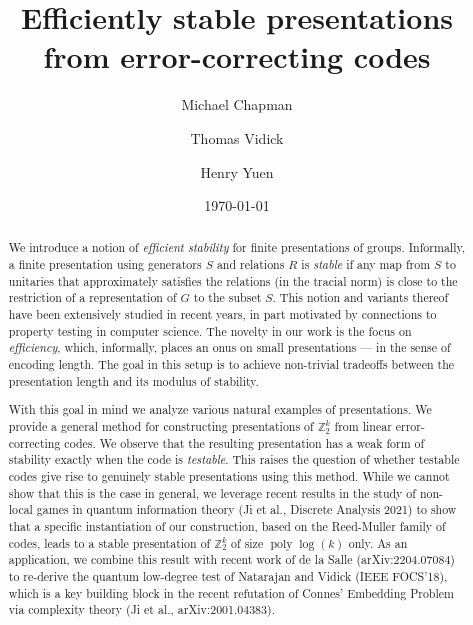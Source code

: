 \documentclass[11pt]{article}
\theoremstyle{definition}
\newcommand{\Z}{\ensuremath{\mathbb{Z}}}
\DeclareMathOperator{\poly}{poly}
\begin{document}
\title{Efficiently stable presentations from error-correcting codes}

\author[1]{Michael Chapman}
\author[2]{Thomas Vidick}
\author[3]{Henry Yuen}

\date{\today}
\maketitle

\noteswarning


\begin{abstract}
We introduce a notion of \emph{efficient stability} for finite presentations of groups. Informally, a finite presentation using generators $S$ and relations $R$ is \emph{stable} if any map from $S$ to unitaries 
that approximately satisfies the relations (in the tracial norm) is close to the restriction of a representation of $G$ to the subset $S$. This notion and variants thereof have been extensively studied in recent years, in part motivated by connections to property testing in computer science. The novelty in our work is the focus on \emph{efficiency}, which, informally, places an onus on small presentations --- in the sense of encoding length.  
The goal in this setup is to achieve non-trivial tradeoffs between the presentation length and its modulus of stability.

With this goal in mind we analyze various natural examples of presentations. We provide a general method for constructing presentations of $\Z_2^k$ from linear error-correcting codes. We observe that the resulting presentation has a weak form of stability exactly when the code is  \emph{testable}. This raises the question of whether testable codes give rise to genuinely stable presentations using this method.  While we cannot show that this is the case in general, we leverage recent results in the study of non-local games in quantum information theory (Ji et al., Discrete Analysis 2021) to show that a specific instantiation of our construction, based on the Reed-Muller family of codes, leads to a stable presentation of $\Z_2^k$ of size $\poly\log(k)$ only. As an application, we combine this result with recent work of de la Salle (arXiv:2204.07084) to re-derive  the quantum low-degree test of Natarajan and Vidick (IEEE FOCS'18), which is a key building block in the recent refutation of Connes' Embedding Problem via complexity theory (Ji et al., arXiv:2001.04383). 
\end{abstract}
\end{document}
